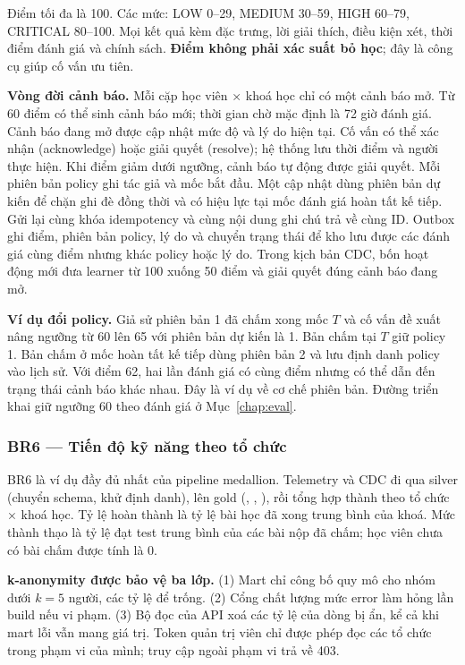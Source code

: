 Điểm tối đa là 100. Các mức: LOW 0--29, MEDIUM 30--59, HIGH 60--79, CRITICAL 80--100. Mọi kết quả kèm đặc trưng, lời giải thích, điều kiện xét, thời điểm đánh giá và chính sách. \textbf{Điểm không phải xác suất bỏ học}; đây là công cụ giúp cố vấn ưu tiên.

\textbf{Vòng đời cảnh báo.} Mỗi cặp học viên × khoá học chỉ có một cảnh báo mở. Từ 60 điểm có thể sinh cảnh báo mới; thời gian chờ mặc định là 72 giờ đánh giá. Cảnh báo đang mở được cập nhật mức độ và lý do hiện tại. Cố vấn có thể xác nhận (acknowledge) hoặc giải quyết (resolve); hệ thống lưu thời điểm và người thực hiện. Khi điểm giảm dưới ngưỡng, cảnh báo tự động được giải quyết. Mỗi phiên bản policy ghi tác giả và mốc bắt đầu. Một cập nhật dùng phiên bản dự kiến để chặn ghi đè đồng thời và có hiệu lực tại mốc đánh giá hoàn tất kế tiếp. Gửi lại cùng khóa idempotency và cùng nội dung ghi chú trả về cùng ID. Outbox ghi điểm, phiên bản policy, lý do và chuyển trạng thái để kho lưu được các đánh giá cùng điểm nhưng khác policy hoặc lý do. Trong kịch bản CDC, bốn hoạt động mới đưa learner từ 100 xuống 50 điểm và giải quyết đúng cảnh báo đang mở.

\textbf{Ví dụ đổi policy.} Giả sử phiên bản 1 đã chấm xong mốc $T$ và cố vấn đề xuất nâng ngưỡng từ 60 lên 65 với phiên bản dự kiến là 1. Bản chấm tại $T$ giữ policy 1. Bản chấm ở mốc hoàn tất kế tiếp dùng phiên bản 2 và lưu định danh policy vào lịch sử. Với điểm 62, hai lần đánh giá có cùng điểm nhưng có thể dẫn đến trạng thái cảnh báo khác nhau. Đây là ví dụ về cơ chế phiên bản. Đường triển khai giữ ngưỡng 60 theo đánh giá ở Mục~\ref{chap:eval}.

\subsubsection{BR6 --- Tiến độ kỹ năng theo tổ chức}

BR6 là ví dụ đầy đủ nhất của pipeline medallion. Telemetry và CDC đi qua silver (chuyển schema, khử định danh), lên gold (, , ), rồi tổng hợp thành  theo tổ chức × khoá học. Tỷ lệ hoàn thành là tỷ lệ bài học đã xong trung bình của khoá. Mức thành thạo là tỷ lệ đạt test trung bình của các bài nộp đã chấm; học viên chưa có bài chấm được tính là 0.

\textbf{k-anonymity được bảo vệ ba lớp.} (1) Mart chỉ công bố quy mô cho nhóm dưới $k = 5$ người, các tỷ lệ để trống. (2) Cổng chất lượng mức error  làm hỏng lần build nếu vi phạm. (3) Bộ đọc của API xoá các tỷ lệ của dòng bị ẩn, kể cả khi mart lỗi vẫn mang giá trị. Token quản trị viên chỉ được phép đọc các tổ chức trong phạm vi của mình; truy cập ngoài phạm vi trả về 403.


